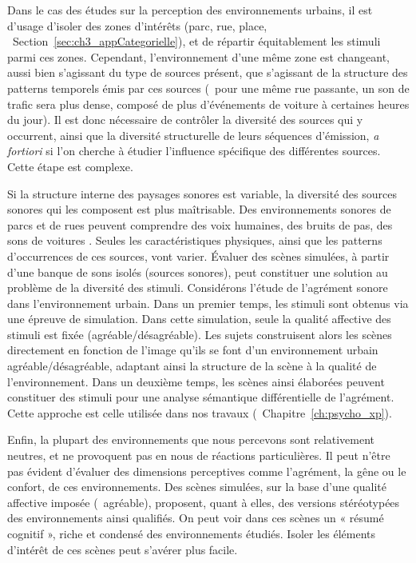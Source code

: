 \begin{itemize}
Dans le cas des études sur la perception des environnements urbains, il est d'usage d'isoler des zones d’intérêts (parc, rue, place, \cf~Section~\ref{sec:ch3_appCategorielle}), et de répartir équitablement les stimuli parmi ces zones. Cependant, l'environnement d'une même zone est changeant, aussi bien s'agissant du type de sources présent, que s'agissant de la structure des patterns temporels émis par ces sources (\eg~pour une même rue passante, un son de trafic sera plus dense, composé de plus d'événements de voiture à certaines heures du jour). Il est donc nécessaire de contrôler la diversité des sources qui y occurrent, ainsi que la diversité structurelle de leurs séquences d'émission, \emph{a fortiori} si l'on cherche à étudier l'influence spécifique des différentes sources. Cette étape est complexe. 

Si la structure interne des paysages sonores est variable, la diversité des sources sonores qui les composent est plus maîtrisable. Des environnements sonores de parcs et de rues peuvent comprendre des voix humaines, des bruits de pas, des sons de voitures \etc. Seules les caractéristiques physiques, ainsi que les patterns d'occurrences de ces sources, vont varier. Évaluer des scènes simulées, à partir d'une banque de sons isolés (sources sonores), peut constituer une solution au problème de la diversité des stimuli. Considérons l'étude de l'agrément sonore dans l'environnement urbain. Dans un premier temps, les stimuli sont obtenus via une épreuve de simulation. Dans cette simulation, seule la qualité affective des stimuli est fixée (agréable/désagréable). Les sujets construisent alors les scènes directement en fonction de l'image qu'ils se font d'un environnement urbain agréable/désagréable, adaptant ainsi la structure de la scène à la qualité de l'environnement. Dans un deuxième temps, les scènes ainsi élaborées peuvent constituer des stimuli pour une analyse sémantique différentielle de l'agrément. Cette approche est celle utilisée dans nos travaux (\cf~Chapitre~\ref{ch:psycho_xp}). 

Enfin, la plupart des environnements que nous percevons sont relativement neutres, et ne provoquent pas en nous de réactions particulières. Il peut n'être pas évident d'évaluer des dimensions perceptives comme l'agrément, la gêne ou le confort, de ces environnements. Des scènes simulées, sur la base d'une qualité affective imposée (\eg~agréable), proposent, quant à elles, des versions stéréotypées des environnements ainsi qualifiés. On peut voir dans ces scènes un « résumé cognitif », riche et condensé des environnements étudiés. Isoler les éléments d'intérêt de ces scènes peut s'avérer plus facile.

\end{itemize}

